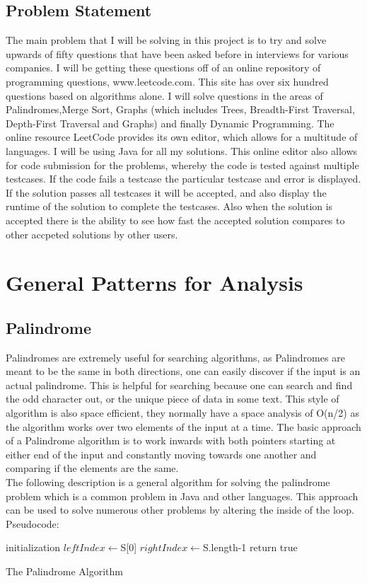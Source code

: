 \documentclass[10pt,twocolumn]{IEEEtran}
\begin{document}
\subsection{Problem Statement}
The main problem that I will be solving in this project is to try and solve upwards of fifty questions that have been asked before in interviews for various companies. I will be getting these questions off of an online repository of programming questions, www.leetcode.com\cite{leet1}. This site has over six hundred questions based on algorithms alone. I will solve questions in the areas of Palindromes,Merge Sort, Graphs (which includes Trees, Breadth-First Traversal, Depth-First Traversal and Graphs) and finally Dynamic Programming. The online resource LeetCode provides its own editor, which allows for a multitude of languages. I will be using Java for all my solutions. This online editor also allows for code submission for the problems, whereby the code is tested against multiple testcases. If the code fails a testcase the particular testcase and error is displayed. If the solution passes all testcases it will be accepted, and also display the runtime of the solution to complete the testcases. Also when the solution is accepted there is the ability to see how fast the accepted solution compares to other accpeted solutions by other users.  
\section{General Patterns for Analysis}
\subsection{Palindrome}
Palindromes are extremely useful for searching algorithms, as Palindromes are meant to be the same in both directions, one can easily discover if the input is an actual palindrome. This is helpful for searching because one can search and find the odd character out, or the unique piece of data in some text. This style of algorithm is also space efficient, they normally have a space analysis of O(n/2) as the algorithm works over two elements of the input at a time. The basic approach of a Palindrome algorithm is to work inwards with both pointers starting at either end of the input and constantly moving towards one another and comparing if the elements are the same.\\  
The following description is a general algorithm for solving the palindrome problem which is a common problem in Java and other languages. This approach can be used to solve numerous other problems by altering the inside of the loop.
Pseudocode:
\IncMargin{1em}
\begin{algorithm}
	\SetAlgoLined
	initialization\;
	$leftIndex  \longleftarrow $S[0]\;
	$rightIndex \longleftarrow $S.length-1\;
return true\;
\caption{The Palindrome Algorithm}
\end{algorithm}\DecMargin{1em}
\end{document}

